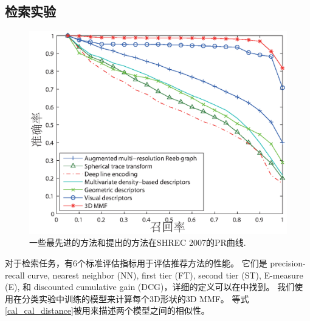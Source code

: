 \subsection{检索实验}

\begin{figure}[tbhp]
\begin{center}
\includegraphics[width=1\linewidth]{figures/PR2007}
\end{center} 
\vspace{-4mm}
\caption{一些最先进的方法和提出的方法在SHREC 2007的PR曲线.} \label{fig_rp_shrec2007}
\end{figure}

对于检索任务，有6个标准评估指标用于评估推荐方法的性能。 它们是 precision-recall curve, nearest neighbor (NN), first tier (FT), second tier (ST), E-measure (E), 和 discounted cumulative gain (DCG)，详细的定义可以在\cite{shilane2004princeton}中找到。 我们使用在分类实验中训练的模型来计算每个3D形状的3D MMF。 等式 \eqref{cal_cal_distance}被用来描述两个模型之间的相似性。

